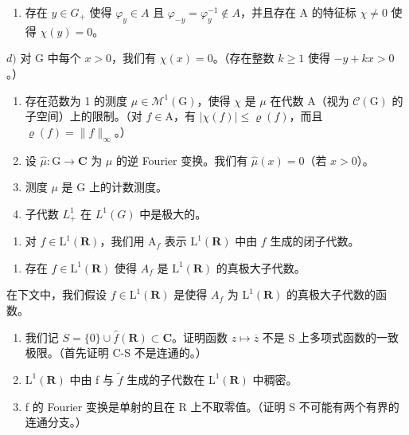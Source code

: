 \begin{enumerate}
\def\labelenumi{\alph{enumi})}
\setcounter{enumi}{2}
\tightlist
\item
  存在 \(y \in G_{+}\) 使得 \(\varphi_{y} \in A\) 且 \(\varphi_{-y} = \varphi_{y}^{-1} \notin A\)，并且存在 A 的特征标 \(\chi \neq 0\) 使得 \(\chi(y) = 0\)。
\end{enumerate}

\(d)\) 对 G 中每个 \(x > 0\)，我们有 \(\chi(x) = 0\)。（存在整数 \(k \geqslant 1\) 使得 \(-y + kx > 0\)。）

\begin{enumerate}
\def\labelenumi{\alph{enumi})}
\setcounter{enumi}{4}
\item
  存在范数为 1 的测度 \(\mu \in \mathcal{M}^1 (\mathrm{G})\)，使得 \(\chi\) 是 \(\mu\) 在代数 A（视为 \(\mathcal{C}(\mathrm{G})\) 的子空间）上的限制。（对 \(f\in \mathrm{A}\)，有 \(|\chi (f)|\leqslant \varrho (f)\)，而且 \(\varrho (f) = \| f\|_{\infty}\)。）
\item
  设 \(\widehat{\mu}\colon\mathrm{G}\to\mathbf{C}\) 为 \(\mu\) 的逆 Fourier 变换。我们有 \(\widehat{\mu}(x)=0\)（若 \(x>0\)）。
\item
  测度 \(\mu\) 是 G 上的计数测度。
\item
  子代数 \(L_{+}^{1}\) 在 \(L^{1}(G)\) 中是极大的。
\end{enumerate}

\begin{enumerate}
\def\labelenumi{\arabic{enumi})}
\setcounter{enumi}{18}
\tightlist
\item
  对 \(f \in \mathrm{L}^1(\mathbf{R})\)，我们用 \(\mathrm{A}_f\) 表示 \(\mathrm{L}^1(\mathbf{R})\) 中由 \(f\) 生成的闭子代数。
\end{enumerate}

\begin{enumerate}
\def\labelenumi{\alph{enumi})}
\tightlist
\item
  存在 \(f \in \mathrm{L}^{1}(\mathbf{R})\) 使得 \(A_{f}\) 是 \(\mathrm{L}^{1}(\mathbf{R})\) 的真极大子代数。
\end{enumerate}

在下文中，我们假设 \(f \in \mathrm{L}^{1}(\mathbf{R})\) 是使得 \(A_{f}\) 为 \(\mathrm{L}^{1}(\mathbf{R})\) 的真极大子代数的函数。

\begin{enumerate}
\def\labelenumi{\alph{enumi})}
\setcounter{enumi}{1}
\item
  我们记 \(S = \{0\} \cup \widehat{f}(\mathbf{R}) \subset \mathbf{C}\)。证明函数 \(z \mapsto \overline{z}\) 不是 S 上多项式函数的一致极限。（首先证明 C-S 不是连通的。）
\item
  \(\mathrm{L}^{1}(\mathbf{R})\) 中由 f 与 \(\widetilde{f}\) 生成的子代数在 \(\mathrm{L}^{1}(\mathbf{R})\) 中稠密。
\item
  f 的 Fourier 变换是单射的且在 R 上不取零值。（证明 S 不可能有两个有界的连通分支。）
\end{enumerate}

